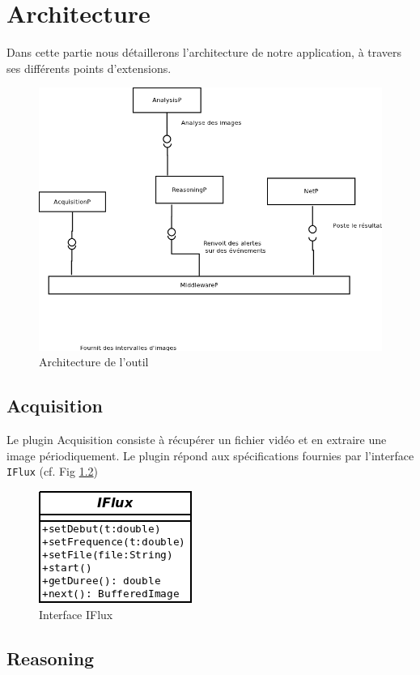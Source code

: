 \chapter{Architecture}
Dans cette partie nous détaillerons l'architecture de notre application, à travers ses différents points d'extensions.
\begin{figure}[htbp]
  \centering
  \includegraphics[scale=0.70]{img/archi}
  \caption{Architecture de l'outil}
  \label{fig:archi}
\end{figure}

\section{Acquisition}
Le plugin Acquisition consiste à récupérer un fichier vidéo et en extraire une image périodiquement. Le plugin répond aux spécifications fournies par l'interface \verb+IFlux+ (cf. Fig \ref{})
\begin{figure}[htbp]
  \centering
  \includegraphics[scale=0.50]{img/IFlux}
  \caption{Interface IFlux}
  \label{fig:IFlux}
\end{figure}
\section{Reasoning}


